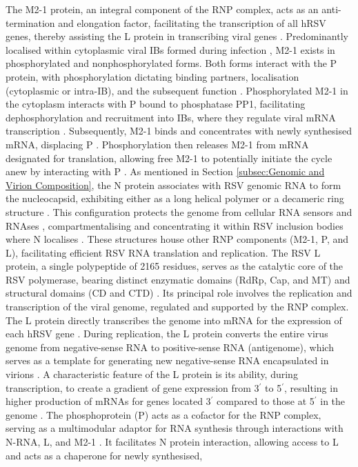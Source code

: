 The M2-1 protein, an integral component of the RNP complex, acts as an anti-termination and elongation factor, facilitating the transcription of all hRSV genes, thereby assisting the L protein in transcribing viral genes \cite{Collins1996TranscriptionVirus., Noton2015InitiationReplication}. Predominantly localised within cytoplasmic viral IBs formed during infection \cite{Rincheval2017FunctionalVirus}, M2-1 exists in phosphorylated and nonphosphorylated forms. Both forms interact with the P protein, with phosphorylation dictating binding partners, localisation (cytoplasmic or intra-IB), and the subsequent function \cite{Richard2018RSVTranscription}. Phosphorylated M2-1 in the cytoplasm interacts with P bound to phosphatase PP1, facilitating dephosphorylation and recruitment into IBs, where they regulate viral mRNA transcription \cite{Richard2018RSVTranscription}. Subsequently, M2-1 binds and concentrates with newly synthesised mRNA, displacing P \cite{Blondot2012StructureProtein.}. Phosphorylation then releases M2-1 from mRNA designated for translation, allowing free M2-1 to potentially initiate the cycle anew by interacting with P \cite{Richard2018RSVTranscription}. As mentioned in Section \ref{subsec:Genomic and Virion Composition}, the N protein associates with RSV genomic RNA to form the nucleocapsid, exhibiting either as a long helical polymer or a decameric ring structure \cite{Gonnin2023StructuralNucleocapsids}. This configuration protects the genome from cellular RNA sensors and RNAses \cite{Tawar2009CrystalVirus}, compartmentalising and concentrating it within RSV inclusion bodies where N localises \cite{Rincheval2017FunctionalVirus}. These structures house other RNP components (M2-1, P, and L), facilitating efficient RSV RNA translation and replication. The RSV L protein, a single polypeptide of 2165 residues, serves as the catalytic core of the RSV polymerase, bearing distinct enzymatic domains (RdRp, Cap, and MT) and structural domains (CD and CTD) \cite{Gilman2019StructureComplex, Cao2020Cryo-EMPolymerase}. Its principal role involves the replication and transcription of the viral genome, regulated and supported by the RNP complex. The L protein directly transcribes the genome into mRNA for the expression of each hRSV gene \cite{Cowton2006UnravellingSynthesis, Noton2015InitiationReplication}. During replication, the L protein converts the entire virus genome from negative-sense RNA to positive-sense RNA (antigenome), which serves as a template for generating new negative-sense RNA encapsulated in virions \cite{Cowton2006UnravellingSynthesis, Fearns2000FunctionalVirus}. A characteristic feature of the L protein is its ability, during transcription, to create a gradient of gene expression from 3$^{\prime}$ to 5$^{\prime}$, resulting in higher production of mRNAs for genes located 3$^{\prime}$ compared to those at 5$^{\prime}$ in the genome \cite{Hardy1998TheTranscription, Kuo1996TheMinigenome}. The phosphoprotein (P) acts as a cofactor for the RNP complex, serving as a multimodular adaptor for RNA synthesis through interactions with N-RNA, L, and M2-1 \cite{Blondot2012StructureProtein., Cardone2021APhosphoprotein}. It facilitates N protein interaction, allowing access to L \cite{Sourimant2015FinePhosphoprotein} and acts as a chaperone for newly synthesised, 